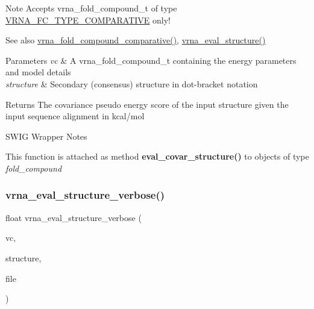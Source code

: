 \begin{DoxyNote}{Note}
Accepts vrna\+\_\+fold\+\_\+compound\+\_\+t of type \hyperlink{group__fold__compound_gga01a4ff86fa71deaaa5d1abbd95a1447dab821ce46ea3cf665be97df22a76f5023}{V\+R\+N\+A\+\_\+\+F\+C\+\_\+\+T\+Y\+P\+E\+\_\+\+C\+O\+M\+P\+A\+R\+A\+T\+I\+VE} only!
\end{DoxyNote}
\begin{DoxySeeAlso}{See also}
\hyperlink{group__fold__compound_gad6bacc816af274922b13d947f708aa0c}{vrna\+\_\+fold\+\_\+compound\+\_\+comparative()}, \hyperlink{group__eval_ga58f199f1438d794a265f3b27fc8ea631}{vrna\+\_\+eval\+\_\+structure()}
\end{DoxySeeAlso}

\begin{DoxyParams}{Parameters}
{\em vc} & A vrna\+\_\+fold\+\_\+compound\+\_\+t containing the energy parameters and model details \\
\hline
{\em structure} & Secondary (consensus) structure in dot-\/bracket notation \\
\hline
\end{DoxyParams}
\begin{DoxyReturn}{Returns}
The covariance pseudo energy score of the input structure given the input sequence alignment in kcal/mol
\end{DoxyReturn}
\begin{DoxyRefDesc}{S\+W\+I\+G Wrapper Notes}
\item[\hyperlink{wrappers__wrappers000035}{S\+W\+I\+G Wrapper Notes}]This function is attached as method {\bfseries eval\+\_\+covar\+\_\+structure()} to objects of type {\itshape fold\+\_\+compound} \end{DoxyRefDesc}
\mbox{\label{group__eval_ga0928d699d310178f84ee2351034e5cb5}} 
\subsubsection{\texorpdfstring{vrna\+\_\+eval\+\_\+structure\+\_\+verbose()}{vrna\_eval\_structure\_verbose()}}
{\footnotesize\ttfamily float vrna\+\_\+eval\+\_\+structure\+\_\+verbose (\begin{DoxyParamCaption}\item[{\hyperlink{group__fold__compound_ga1b0cef17fd40466cef5968eaeeff6166}{vrna\+\_\+fold\+\_\+compound\+\_\+t} $\ast$}]{vc,  }\item[{const char $\ast$}]{structure,  }\item[{F\+I\+LE $\ast$}]{file }\end{DoxyParamCaption})}



